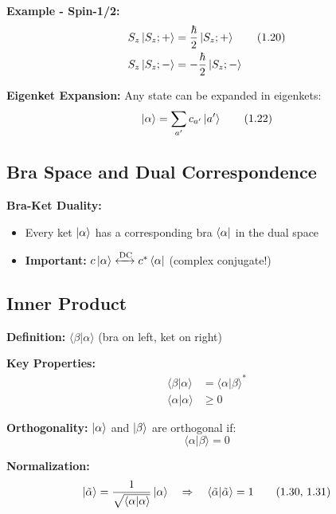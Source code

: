 \documentclass[11pt,a4paper]{article}
\begin{document}
\textbf{Example - Spin-1/2:}
\begin{align}
S_z\ket{S_z; +} &= \frac{\hbar}{2}\ket{S_z; +} \tag{1.20} \\
S_z\ket{S_z; -} &= -\frac{\hbar}{2}\ket{S_z; -} \notag
\end{align}

\textbf{Eigenket Expansion:} Any state can be expanded in eigenkets:
\begin{equation}
\ket{\alpha} = \sum_{a'} c_{a'}\ket{a'}
\tag{1.22}
\end{equation}

\subsection{Bra Space and Dual Correspondence}

\textbf{Bra-Ket Duality:}
\begin{itemize}
\item Every ket $\ket{\alpha}$ has a corresponding bra $\bra{\alpha}$ in the dual space
\item \textbf{Important:} $c\ket{\alpha} \xleftrightarrow{\text{DC}} c^*\bra{\alpha}$ (complex conjugate!)
\end{itemize}

\subsection{Inner Product}

\textbf{Definition:} $\langle\beta|\alpha\rangle$ (bra on left, ket on right)

\textbf{Key Properties:}
\begin{align}
\langle\beta|\alpha\rangle &= \langle\alpha|\beta\rangle^* \tag{1.26} \\
\langle\alpha|\alpha\rangle &\geq 0 \tag{1.27}
\end{align}

\textbf{Orthogonality:} $\ket{\alpha}$ and $\ket{\beta}$ are orthogonal if:
\begin{equation}
\langle\alpha|\beta\rangle = 0 \tag{1.28}
\end{equation}

\textbf{Normalization:}
\begin{equation}
\ket{\tilde{\alpha}} = \frac{1}{\sqrt{\langle\alpha|\alpha\rangle}}\ket{\alpha} \quad \Rightarrow \quad \langle\tilde{\alpha}|\tilde{\alpha}\rangle = 1
\tag{1.30, 1.31}
\end{equation}
\end{document}
